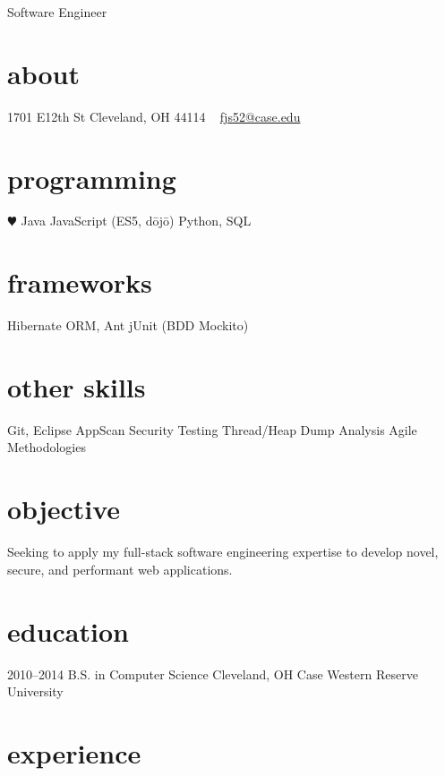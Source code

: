 \documentclass[]{friggeri-cv}
\begin{document}
       {Software Engineer}


\begin{aside}
  \section{about}
    1701 E12th St
    Cleveland, OH
    44114
    ~
    \href{mailto:fjs52@case.edu}{fjs52@case.edu}
  \section{programming}
    {\color{red} $\varheartsuit$} Java
    JavaScript
    (ES5, d\={o}j\={o})
    Python, SQL
  \section{frameworks}
    Hibernate ORM, Ant
    jUnit (BDD Mockito)
  \section{other skills}
    Git, Eclipse
    AppScan Security Testing
    Thread/Heap Dump Analysis
    Agile Methodologies
\end{aside}

\section{objective}
Seeking to apply my full-stack software engineering expertise to develop novel, secure, and performant web applications.

\section{education}

\begin{entrylist}
  \entry
    {2010–2014}
    {B.S. in Computer Science}
    {Cleveland, OH}
    {Case Western Reserve University}
\end{entrylist}

\section{experience}
\end{document}
